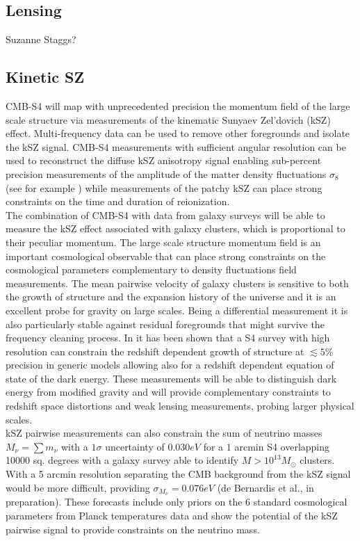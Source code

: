 \subsection{Lensing}

Suzanne Staggs? 

\subsection{Kinetic SZ}

CMB-S4 will map with unprecedented precision the momentum field of the large scale structure via measurements of the kinematic Sunyaev Zel'dovich (kSZ) effect. Multi-frequency data can be used to remove other foregrounds and isolate the kSZ signal. CMB-S4 measurements with sufficient angular resolution can be used to reconstruct the diffuse kSZ anisotropy signal enabling sub-percent precision measurements of the amplitude of the matter density fluctuations $\sigma_8$ (see for example \cite{Calabrese:2014gwa}) while measurements of the patchy kSZ can place strong constraints on the time and duration of reionization.\\
The combination of CMB-S4 with data from galaxy surveys will be able to measure the kSZ effect associated with galaxy clusters, which is proportional to their peculiar momentum. The large scale structure momentum field is an important cosmological observable that can place strong constraints on the cosmological parameters \cite{Bhattacharya:2007sk,Kosowsky:2009nc,Mueller:2014nsa,Mueller:2014dba} complementary to density fluctuations field measurements. The mean pairwise velocity of galaxy clusters is sensitive to both the growth of structure and the expansion history of the universe and it is an excellent probe for gravity on large scales. Being a differential measurement it is also particularly stable against residual foregrounds that might survive the frequency cleaning process. In \cite{Mueller:2014nsa,Mueller:2014dba} it has been shown that a S4 survey with high resolution can constrain the redshift dependent growth of structure at $\lesssim 5\%$ precision in generic models allowing also for a redshift dependent equation of state of the dark energy. These measurements will be able to distinguish dark energy from modified gravity and will provide complementary constraints to redshift space distortions and weak lensing measurements, probing larger physical scales.\\kSZ pairwise measurements can also constrain the sum of neutrino masses $M_{\nu}= \sum m_{\nu}$ with a $1\sigma$ uncertainty of $0.030 eV$ for a $1$ arcmin S4 overlapping 10000 sq. degrees with a galaxy survey able to identify $M>10^{13}M_{\odot}$ clusters. With a 5 arcmin resolution separating the CMB background from the kSZ signal would be more difficult, providing  $\sigma_{M_{\nu}} = 0.076 eV$ (de Bernardis et al., in preparation). These forecasts include only priors on the 6 standard cosmological parameters from Planck temperatures data and show the potential of the kSZ pairwise signal to provide constraints on the neutrino mass. 

